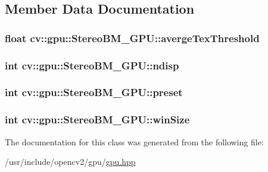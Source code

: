 \subsection{Member Data Documentation}
\hypertarget{classcv_1_1gpu_1_1StereoBM__GPU_a3b57fc867865800b50524725de81cdd4}{
\subsubsection[{averge\-Tex\-Threshold}]{\setlength{\rightskip}{0pt plus 5cm}float cv\-::gpu\-::\-Stereo\-B\-M\-\_\-\-G\-P\-U\-::averge\-Tex\-Threshold}}\label{classcv_1_1gpu_1_1StereoBM__GPU_a3b57fc867865800b50524725de81cdd4}
\hypertarget{classcv_1_1gpu_1_1StereoBM__GPU_aec33b952759ff2881ae7267598bc8097}{
\subsubsection[{ndisp}]{\setlength{\rightskip}{0pt plus 5cm}int cv\-::gpu\-::\-Stereo\-B\-M\-\_\-\-G\-P\-U\-::ndisp}}\label{classcv_1_1gpu_1_1StereoBM__GPU_aec33b952759ff2881ae7267598bc8097}
\hypertarget{classcv_1_1gpu_1_1StereoBM__GPU_a82683f26180823d2e8480b1deecff658}{
\subsubsection[{preset}]{\setlength{\rightskip}{0pt plus 5cm}int cv\-::gpu\-::\-Stereo\-B\-M\-\_\-\-G\-P\-U\-::preset}}\label{classcv_1_1gpu_1_1StereoBM__GPU_a82683f26180823d2e8480b1deecff658}
\hypertarget{classcv_1_1gpu_1_1StereoBM__GPU_a1d849fcce4681317150454fbd685dbc8}{
\subsubsection[{win\-Size}]{\setlength{\rightskip}{0pt plus 5cm}int cv\-::gpu\-::\-Stereo\-B\-M\-\_\-\-G\-P\-U\-::win\-Size}}\label{classcv_1_1gpu_1_1StereoBM__GPU_a1d849fcce4681317150454fbd685dbc8}


The documentation for this class was generated from the following file\-:\begin{DoxyCompactItemize}
\item 
/usr/include/opencv2/gpu/\hyperlink{gpu_2gpu_8hpp}{gpu.\-hpp}\end{DoxyCompactItemize}
